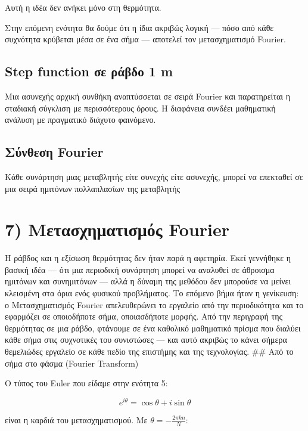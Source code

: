 \documentclass[
  a4paper,
  11pt,
]{article}
\begin{document}
Αυτή η ιδέα δεν ανήκει μόνο στη θερμότητα.

Στην επόμενη ενότητα θα δούμε ότι η ίδια ακριβώς λογική --- πόσο από
κάθε συχνότητα κρύβεται μέσα σε ένα σήμα --- αποτελεί τον μετασχηματισμό
Fourier.

\subsection{Step function σε ράβδο 1
m}\label{step-function-ux3c3ux3b5-ux3c1ux3acux3b2ux3b4ux3bf-1-m}

Μια ασυνεχής αρχική συνθήκη αναπτύσσεται σε σειρά Fourier και
παρατηρείται η σταδιακή σύγκλιση με περισσότερους όρους. Η διαφάνεια
συνδέει μαθηματική ανάλυση με πραγματικό διάχυτο φαινόμενο.

\subsection{Σύνθεση
Fourier}\label{ux3c3ux3cdux3bdux3b8ux3b5ux3c3ux3b7-fourier}

Κάθε συνάρτηση μιας μεταβλητής είτε συνεχής είτε ασυνεχής, μπορεί να
επεκταθεί σε μια σειρά ημιτόνων πολλαπλασίων της μεταβλητής

\section{7) Μετασχηματισμός
Fourier}\label{ux3bcux3b5ux3c4ux3b1ux3c3ux3c7ux3b7ux3bcux3b1ux3c4ux3b9ux3c3ux3bcux3ccux3c2-fourier}

Η ράβδος και η εξίσωση θερμότητας δεν ήταν παρά η αφετηρία. Εκεί
γεννήθηκε η βασική ιδέα --- ότι μια περιοδική συνάρτηση μπορεί να
αναλυθεί σε άθροισμα ημιτόνων και συνημιτόνων --- αλλά η δύναμη της
μεθόδου δεν μπορούσε να μείνει κλεισμένη στα όρια ενός φυσικού
προβλήματος. Το επόμενο βήμα ήταν η γενίκευση: ο Μετασχηματισμός Fourier
απελευθερώνει το εργαλείο από την περιοδικότητα και το εφαρμόζει σε
οποιοδήποτε σήμα, οποιασδήποτε μορφής. Από την περιγραφή της θερμότητας
σε μια ράβδο, φτάνουμε σε ένα καθολικό μαθηματικό πρίσμα που διαλύει
κάθε σήμα στις συχνοτικές του συνιστώσες --- και αυτό ακριβώς το κάνει
σήμερα θεμελιώδες εργαλείο σε κάθε πεδίο της επιστήμης και της
τεχνολογίας. \#\# Από το σήμα στο φάσμα (Fourier Transform)

Ο τύπος του Euler που είδαμε στην ενότητα 5:

\[e^{i\theta} = \cos\theta + i\sin\theta\]

είναι η καρδιά του μετασχηματισμού. Με \(\theta = -\frac{2\pi kn}{N}\):
\end{document}
